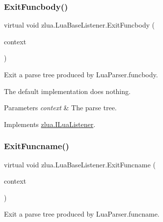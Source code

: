 \subsubsection{\texorpdfstring{Exit\+Funcbody()}{ExitFuncbody()}}
{\footnotesize\ttfamily virtual void zlua.\+Lua\+Base\+Listener.\+Exit\+Funcbody (\begin{DoxyParamCaption}\item[{\mbox{[}\+Not\+Null\mbox{]} \mbox{\hyperlink{classzlua_1_1_lua_parser_1_1_funcbody_context}{Lua\+Parser.\+Funcbody\+Context}}}]{context }\end{DoxyParamCaption})\hspace{0.3cm}{\ttfamily [virtual]}}



Exit a parse tree produced by Lua\+Parser.\+funcbody. 

The default implementation does nothing.


\begin{DoxyParams}{Parameters}
{\em context} & The parse tree.\\
\hline
\end{DoxyParams}


Implements \mbox{\hyperlink{interfacezlua_1_1_i_lua_listener_aecf5d1d01d7cf2dbe880d431e6f5f66f}{zlua.\+I\+Lua\+Listener}}.

\mbox{\label{classzlua_1_1_lua_base_listener_a843fca537940a8a34507118ef087212b}} 
\subsubsection{\texorpdfstring{Exit\+Funcname()}{ExitFuncname()}}
{\footnotesize\ttfamily virtual void zlua.\+Lua\+Base\+Listener.\+Exit\+Funcname (\begin{DoxyParamCaption}\item[{\mbox{[}\+Not\+Null\mbox{]} \mbox{\hyperlink{classzlua_1_1_lua_parser_1_1_funcname_context}{Lua\+Parser.\+Funcname\+Context}}}]{context }\end{DoxyParamCaption})\hspace{0.3cm}{\ttfamily [virtual]}}



Exit a parse tree produced by Lua\+Parser.\+funcname. 

